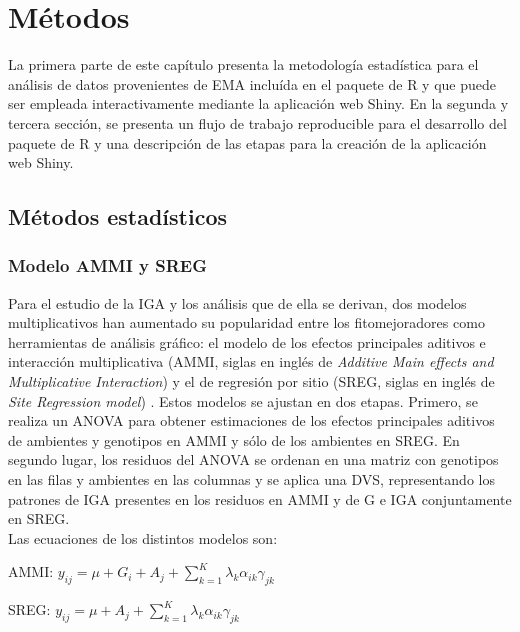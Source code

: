 
\chapter{Métodos}

La primera parte de este capítulo presenta la metodología estadística para el análisis de datos provenientes de EMA incluída en el paquete de R y que puede ser empleada interactivamente mediante la aplicación web Shiny. En la segunda y tercera sección, se presenta un flujo de trabajo reproducible para el desarrollo del paquete de R y una descripción de las etapas para la creación de la aplicación web Shiny.


\section{Métodos estadísticos}

\subsection{Modelo AMMI y SREG}
Para el estudio de la IGA y los análisis que de ella se derivan, dos modelos multiplicativos han aumentado su popularidad entre los fitomejoradores como herramientas de análisis gráfico: el modelo de los efectos principales aditivos e interacción multiplicativa (AMMI, siglas en inglés de \emph{Additive Main effects and Multiplicative Interaction}) \citep{Gauch1988, Gauch1992} y el de regresión por sitio (SREG, siglas en inglés de \emph{Site Regression model}) \citep{Corneliusetal1996, CrossaCornelius1997}. Estos modelos se ajustan en dos etapas. Primero, se realiza un ANOVA para obtener estimaciones de los efectos principales aditivos de ambientes y genotipos en AMMI y sólo de los ambientes en SREG. En segundo lugar, los residuos del ANOVA se ordenan en una matriz con genotipos en las filas y ambientes en las columnas y se aplica una DVS, representando los patrones de IGA presentes en los residuos en AMMI y de G e IGA conjuntamente en SREG.\\

Las ecuaciones de los distintos modelos son:

\hspace{0.5cm} AMMI: $y_{ij}= \mu + G_i + A_j + \sum_{k=1}^K \lambda_k \alpha_{ik} \gamma_{jk}$

\hspace{0.5cm} SREG: $y_{ij}= \mu + A_j + \sum_{k=1}^K \lambda_k \alpha_{ik} \gamma_{jk}$ 

